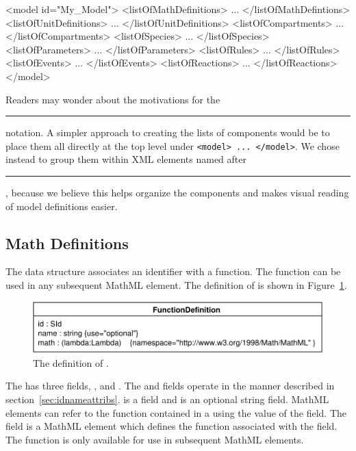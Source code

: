 \documentclass[10pt]{cekarticle}
\newcommand{\vref}[1]{\ref{#1}}
\begin{document}
\begin{example}
<model id="My_Model">
    <listOfMathDefinitions>
        ...
    </listOfMathDefintions>
    <listOfUnitDefinitions>
        ...
    </listOfUnitDefinitions>
    <listOfCompartments>
        ...
    </listOfCompartments>
    <listOfSpecies>
        ...
    </listOfSpecies>
    <listOfParameters>
        ...
    </listOfParameters>
    <listOfRules>
        ...
    </listOfRules>
    <listOfEvents>
        ...
    </listOfEvents>
    <listOfReactions>
        ...
    </listOfReactions>
</model>
\end{example}

Readers may wonder about the motivations for the
\rule{0.5in}{0.5pt} notation.  A simpler approach to
creating the lists of components would be to place them all directly
at the top level under \texttt{<model> ... </model>}.  We chose instead to
group them within XML elements named after
\rule{0.5in}{0.5pt}, because we believe this helps
organize the components and makes visual reading of model definitions
easier.

\subsection{Math Definitions}
\label{sec:functions}

The  data structure associates an identifier
with a function.  The function can be used in any subsequent
MathML  element.  The definition of
 is shown in
Figure~\vref{fig:mathdefinition}.

\begin{figure}[htb]
  \centering
  \includegraphics[scale = 0.68]{mathdefinition}
  \caption{The definition of .}
  \label{fig:mathdefinition}
\end{figure}

The  has three fields, ,
 and . The  and
 fields operate in the manner described in
section~\ref{sec:idnameattribs}.   is a 
field and  is an optional string field. MathML
elements can refer to the function contained in a
 using the value of the  field.
The  field is a MathML  element
which defines the function associated with the  field.
The function is only available for use in subsequent MathML
elements.
\end{document}
